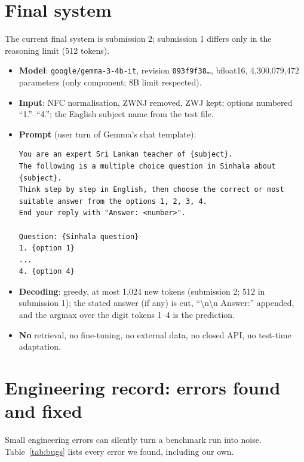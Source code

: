 \documentclass[10pt,a4paper]{article}
\begin{document}
\section{Final system}\label{sec:system}
The current final system is submission 2; submission 1 differs only in the reasoning limit (512 tokens).
\begin{itemize}
\item \textbf{Model}: \texttt{google/gemma-3-4b-it}, revision \texttt{093f9f38\ldots}, bfloat16, 4,300,079,472
parameters (only component; 8B limit respected).
\item \textbf{Input}: NFC normalisation, ZWNJ removed, ZWJ kept; options numbered ``1.''--``4.''; the English subject
name from the test file.
\item \textbf{Prompt} (user turn of Gemma's chat template):
\begin{Verbatim}[fontsize=\small,frame=single]
You are an expert Sri Lankan teacher of {subject}.
The following is a multiple choice question in Sinhala about {subject}.
Think step by step in English, then choose the correct or most suitable answer from the options 1, 2, 3, 4.
End your reply with "Answer: <number>".

Question: {Sinhala question}
1. {option 1}
...
4. {option 4}
\end{Verbatim}
\item \textbf{Decoding}: greedy, at most 1,024 new tokens (submission 2; 512 in submission 1); the stated answer (if
any) is cut, ``\textbackslash n\textbackslash n Answer:\textvisiblespace'' appended, and the argmax over the digit
tokens 1--4 is the prediction.
\item \textbf{No} retrieval, no fine-tuning, no external data, no closed API, no test-time adaptation.
\end{itemize}

\section{Engineering record: errors found and fixed}\label{sec:bugs}
Small engineering errors can silently turn a benchmark run into noise. Table~\ref{tab:bugs} lists every error we
found, including our own.
\end{document}
